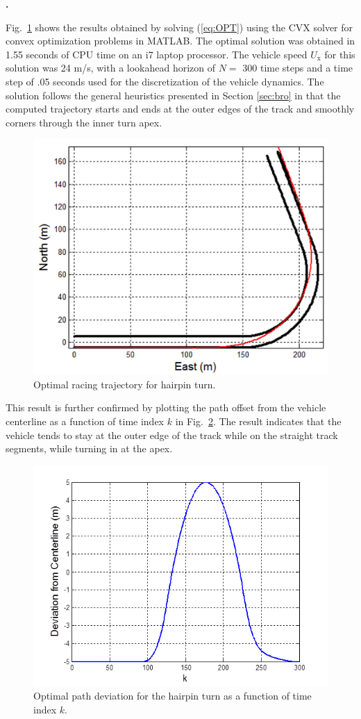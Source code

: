 \documentclass[10pt,a4paper]{article}
\def\section#1{\refstepcounter{section} \vspace{3.5mm} \noindent
{\normalsize\bf {\thesection.}} \hspace{0.5mm}{\normalsize\bf #1} \par \vspace{2mm}}
\begin{document}

\section{SIMULATION RESULTS}
\label{sec:vvfb}

Fig.~\ref{fig:optPath} shows the results obtained by solving (\ref{eq:OPT}) using the CVX solver for convex optimization problems in MATLAB. The optimal
solution was obtained in 1.55 seconds of CPU time on an i7 laptop processor. The vehicle speed $U_\mathrm{x}$ for this solution was 24 m/s, with a lookahead 
horizon of $N =$ 300 time steps and a time step of .05 seconds
used for the discretization of the vehicle dynamics. The solution follows the general heuristics presented in Section \ref{sec:bro} in that
the computed trajectory starts and ends at the outer edges of the track and smoothly corners through the inner turn apex. 
 
\begin{figure}[h]
\centering
\includegraphics[width=3 in]{figures/optPath.png}
\caption{Optimal racing trajectory for hairpin turn.}
\label{fig:optPath}
\end{figure}

This result is further confirmed by plotting the path offset from the vehicle centerline as a function of time index $k$ in Fig.~\ref{fig:ePlot}. The result indicates
that the vehicle tends to stay at the outer edge of the track while on the straight track segments, while turning in at the apex.

\begin{figure}[h]
\centering
\includegraphics[width=3 in]{figures/ePlot.png}
\caption{Optimal path deviation for the hairpin turn as a function of time index $k$.}
\label{fig:ePlot}
\end{figure}
\end{document}
